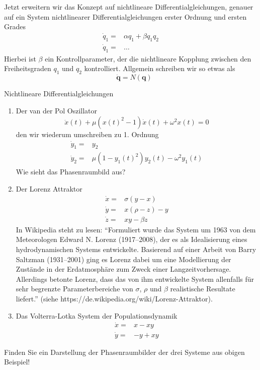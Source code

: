 Jetzt erweitern wir das Konzept auf nichtlineare Differentialgleichungen,
genauer auf ein System nichtlinearer Differentialgleichungen erster Ordnung und
ersten Grades
\begin{align*}
\dot q_1 =& \alpha q_1 + \beta q_1q_2\\
\dot q_1 =&\dots
\end{align*}
Hierbei ist $\beta$ ein Kontrollparameter, der die nichtlineare Kopplung
zwischen den Freiheitsgraden $q_1$ und $q_2$ kontrolliert. Allgemein schreiben
wir so etwas als
\begin{equation}
  \quad\dot{\mathbf{q}}=N(\mathbf{q})
  \label{eq:NLDGLSystem}
\end{equation}
\begin{example}{Nichtlineare Differentialgleichungen}
  \begin{enumerate}
   \item Der van der Pol Oszillator
    \[\ddot x(t)+\mu(x(t)^2-1)\dot x(t)+\omega^2x(t)=0 \]
    den wir wiederum umschreiben zu 1. Ordnung
    \begin{align*}
     \dot y_1=&y_2\\
     \dot y_2=&\mu(1-y_1(t)^2) y_2(t)-\omega^2y_1(t)
    \end{align*}
    Wie sieht das Phasenraumbild aus?
   \item Der Lorenz Attraktor
     \begin{align*}
       \dot x=&\sigma(y-x)\\
       \dot y=&x(\rho-z)-y\\
     \dot z=&xy-\beta z
    \end{align*}
     In Wikipedia steht zu lesen:
     ``Formuliert wurde das System um 1963 von dem Meteorologen Edward N. Lorenz
     (1917–2008), der es als Idealisierung eines hydrodynamischen Systems
     entwickelte. Basierend auf einer Arbeit von Barry Saltzman (1931–2001)
     ging es Lorenz dabei um eine Modellierung der Zustände in der
     Erdatmosphäre zum Zweck einer Langzeitvorhersage. Allerdings betonte
     Lorenz, dass das von ihm entwickelte System allenfalls für sehr begrenzte
     Parameterbereiche von $\sigma$, $\rho$ und $\beta$ realistische
      Resultate liefert.'' (siehe https://de.wikipedia.org/wiki/Lorenz-Attraktor).
   \item Das Volterra-Lotka System der Populationsdynamik
     \begin{align*}
       \dot x=&x-xy\\
       \dot y=&-y+xy
     \end{align*}
  \end{enumerate}
\end{example}
Finden Sie ein Darstellung der Phasenraumbilder der drei Systeme aus obigen
Beispiel!
